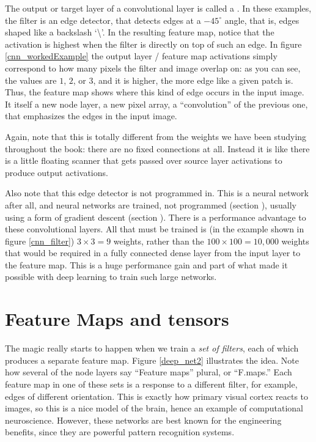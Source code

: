The output or target layer of a convolutional layer is called a . In these examples, the filter is an edge detector, that detects edges at a $-45^\circ$ angle, that is, edges shaped like a backslash `\textbackslash'. In the resulting feature map, notice that the activation is highest when the filter is directly on top of such an edge. In figure \ref{cnn_workedExample} the output layer / feature map activations simply correspond to how many pixels the filter and image overlap on: as you can see, the values are $1$, $2$, or $3$, and it is higher, the more edge like a given patch is. Thus, the feature map shows where this kind of edge occurs in the input image. It itself a new node layer, a new pixel array, a ``convolution'' of the previous one, that emphasizes the edges in the input image.

Again, note that this is totally different from the weights we have been studying throughout the book: there are no fixed connections at all. Instead it is like there is a little floating scanner that gets passed over source layer activations to produce output activations.

Also note that this edge detector is not programmed in. This is a neural network after all, and neural networks are trained, not programmed (section ), usually using a form of gradient descent (section ). There is a performance advantage to these convolutional layers. All that must be trained is (in the example shown in figure \ref{cnn_filter}) $3 \times 3=9$ weights, rather than the $100 \times 100 = 10,000$ weights that would be required in a fully connected dense layer from the input layer to the feature map. This is a huge performance gain and part of what  made it possible with deep learning to train such large networks.

\section{Feature Maps and tensors}

The magic really starts to happen when we train a \emph{set of filters}, each of which produces a separate feature map.  Figure \ref{deep_net2} illustrates the idea. Note how several of the node layers say ``Feature maps'' plural, or ``F.maps.'' Each feature map in one of these sets is a response to a different filter, for example, edges of different orientation. This is exactly how primary visual cortex reacts to images, so this is a nice model of the brain, hence an example of computational  neuroscience. However, these networks are best known for the engineering benefits, since they are powerful pattern recognition systems.


